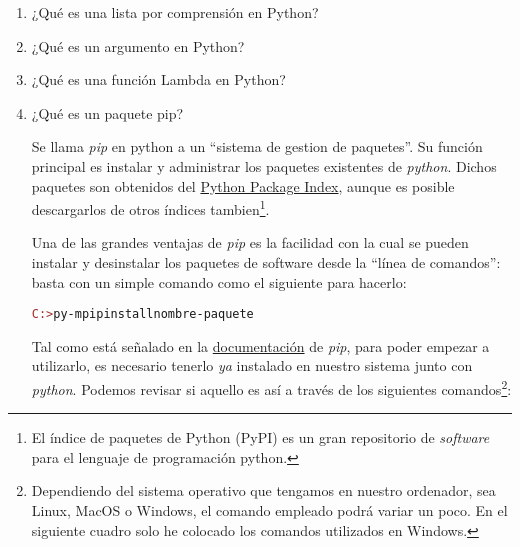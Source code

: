 \documentclass{article}
\begin{document}
\begin{enumerate}
\begin{itemize}
\begin{tcolorbox}
\begin{alltt}
a = \textcolor{purple}{1}
while a < \textcolor{purple}{10}:
    print(\textcolor{red}{"¡Hola mundo!"})
    a = a + \textcolor{purple}{1}
\end{alltt}        
\end{tcolorbox}
    



\item Bucle \emph{for}
\end{itemize}

\item ¿Qué es una lista por comprensión en Python?

\item ¿Qué es un argumento en Python?

\item ¿Qué es una función Lambda en Python?

\item ¿Qué es un paquete pip?

\par \hspace{5pt} Se llama \emph{pip} en python a un ``sistema de gestion de paquetes''. Su función principal es instalar y administrar los paquetes existentes de \emph{python}. Dichos paquetes son obtenidos del \href{https://pypi.org/}{Python Package Index}, aunque es posible descargarlos de otros índices tambien\footnote
{
El índice de paquetes de Python (PyPI) es un gran repositorio de \emph{software} para el lenguaje de programación python.
}.

\par \hspace{5pt} Una de las grandes ventajas de \emph{pip} es la facilidad con la cual se pueden instalar y desinstalar los paquetes de software desde la ``línea de comandos'': basta con un simple comando como el siguiente para hacerlo:

\begin{tcolorbox}
\begin{alltt}
\textcolor{brown}{C:>} py -m pip install nombre-paquete 
\end{alltt}        
\end{tcolorbox}
    

\par \hspace{5pt} Tal como está señalado en la \href{https://pip.pypa.io/en/stable/}{documentación} de \emph{pip}, para poder empezar a utilizarlo, es necesario tenerlo \emph{ya} instalado en nuestro sistema junto con \emph{python}. Podemos revisar si aquello es así a través de los siguientes comandos\footnote
{
Dependiendo del sistema operativo que tengamos en nuestro ordenador, sea Linux, MacOS o Windows, el comando empleado podrá variar un poco. En el siguiente cuadro  solo he colocado los comandos utilizados en Windows. 
}:  


\end{enumerate}
\end{document}
